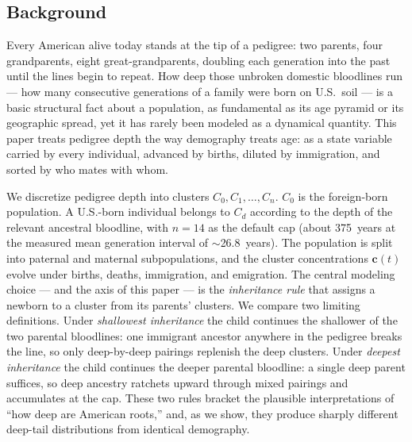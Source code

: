 \documentclass[11pt,a4paper]{article}
\begin{document}
\subsection{Background}
Every American alive today stands at the tip of a pedigree: two parents,
four grandparents, eight great-grandparents, doubling each generation
into the past until the lines begin to repeat.  How deep those
unbroken domestic bloodlines run --- how many consecutive generations of
a family were born on U.S.\ soil --- is a basic structural fact about a
population, as fundamental as its age pyramid or its geographic spread,
yet it has rarely been modeled as a dynamical quantity.  This paper
treats pedigree depth the way demography treats age: as a state variable
carried by every individual, advanced by births, diluted by immigration,
and sorted by who mates with whom.

We discretize pedigree depth into clusters $C_0,C_1,\dots,C_n$.
$C_0$ is the foreign-born population.  A U.S.-born individual belongs
to $C_d$ according to the depth of the relevant ancestral bloodline,
with $n=14$ as the default cap (about 375~years at the measured mean
generation interval of $\sim$26.8~years).  The population is split
into paternal and maternal subpopulations, and the cluster
concentrations $\mathbf{c}(t)$ evolve under births, deaths,
immigration, and emigration.  The central modeling choice --- and the
axis of this paper --- is the \emph{inheritance rule} that assigns a
newborn to a cluster from its parents' clusters.  We compare two
limiting definitions.  Under \emph{shallowest inheritance} the child
continues the shallower of the two parental bloodlines: one immigrant
ancestor anywhere in the pedigree breaks the line, so only deep-by-deep
pairings replenish the deep clusters.  Under \emph{deepest inheritance}
the child continues the deeper parental bloodline: a single deep parent
suffices, so deep ancestry ratchets upward through mixed pairings and
accumulates at the cap.  These two rules bracket the plausible
interpretations of ``how deep are American roots,'' and, as we show,
they produce sharply different deep-tail distributions from identical
demography.
\end{document}
